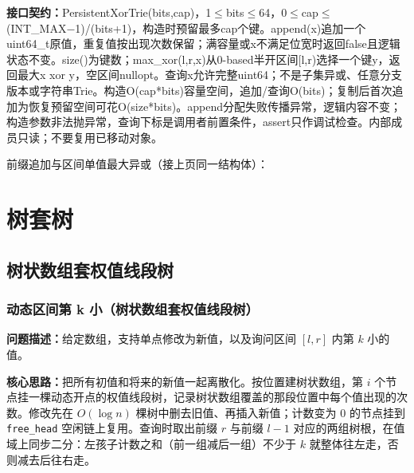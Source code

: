 {\sloppy{}\noindent\textbf{接口契约：}PersistentXorTrie(bits,cap)，1$\le$bits$\le$64，0$\le$cap$\le$(INT\_MAX−1)/(bits+1)，构造时预留最多cap个键。append(x)追加一个uint64\_t原值，重复值按出现次数保留；满容量或x不满足位宽时返回false且逻辑状态不变。size()为键数；max\_xor(l,r,x)从0-based半开区间[l,r)选择一个键y，返回最大x xor y，空区间nullopt。查询x允许完整uint64；不是子集异或、任意分支版本或字符串Trie。构造O(cap*bits)容量空间，追加/查询O(bits)；复制后首次追加为恢复预留空间可花O(size*bits)。append分配失败传播异常，逻辑内容不变；构造参数非法抛异常，查询下标是调用者前置条件，assert只作调试检查。内部成员只读；不要复用已移动对象。\par}

\Needspace{400pt}



\newpage

\noindent 前缀追加与区间单值最大异或（接上页同一结构体）：



\Needspace{180pt}

\chapter{树套树}

\section{树状数组套权值线段树}

\subsection{动态区间第 k 小（树状数组套权值线段树）}\label{compact-DynamicKth}

\noindent\textbf{问题描述：}\allowbreak 给定数组，支持单点修改为新值，以及询问区间 $[l,r]$ 内第 $k$ 小的值。

\textbf{核心思路：}\allowbreak 把所有初值和将来的新值一起离散化。按位置建树状数组，第 $i$ 个节点挂一棵动态开点的权值线段树，记录树状数组覆盖的那段位置中每个值出现的次数。修改先在 $O(\log n)$ 棵树中删去旧值、再插入新值；计数变为 0 的节点挂到 \texttt{free\_head} 空闲链上复用。查询时取出前缀 $r$ 与前缀 $l-1$ 对应的两组树根，在值域上同步二分：左孩子计数之和（前一组减后一组）不少于 $k$ 就整体往左走，否则减去后往右走。



